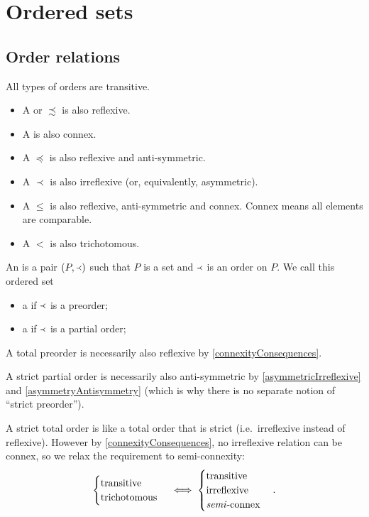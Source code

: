\chapter{Ordered sets}
\section{Order relations}
\begin{definition}
All types of orders are transitive.
\begin{itemize}
\item A  or  $\precsim$ is also reflexive.
\item A  is also connex.
\item A  $\preceq$ is also reflexive and anti-symmetric.
\item A  $\prec$ is also irreflexive (or, equivalently, asymmetric).
\item A  $\leq$ is also reflexive, anti-symmetric and connex. Connex means all elements are comparable.
\item A  $<$ is also trichotomous.
\end{itemize}
An  is a pair $\sSet{P,\Yleft}$ such that $P$ is a set and $\Yleft$ is an order on $P$. We call this ordered set
\begin{itemize}
\item a  if $\Yleft$ is a preorder;
\item a  if $\Yleft$ is a partial order;
\end{itemize}
\end{definition}

A total preorder is necessarily also reflexive by \ref{connexityConsequences}.

A strict partial order is necessarily also anti-symmetric by \ref{asymmetricIrreflexive} and \ref{asymmetryAntisymmetry} (which is why there is no separate notion of ``strict preorder'').

A strict total order is like a total order that is strict (i.e.\ irreflexive instead of reflexive).  However by \ref{connexityConsequences}, no irreflexive relation can be connex, so we relax the requirement to semi-connexity:
\[ \begin{cases}
\text{transitive} \\ \text{trichotomous}
\end{cases} \iff \begin{cases}
\text{transitive} \\ \text{irreflexive} \\ \text{\textit{semi}-connex}
\end{cases}. \]

